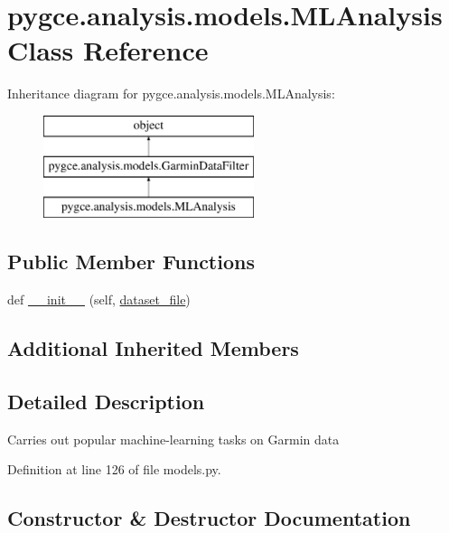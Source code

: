 \hypertarget{classpygce_1_1analysis_1_1models_1_1_m_l_analysis}{}\section{pygce.\+analysis.\+models.\+M\+L\+Analysis Class Reference}
\label{classpygce_1_1analysis_1_1models_1_1_m_l_analysis}
Inheritance diagram for pygce.\+analysis.\+models.\+M\+L\+Analysis\+:\begin{figure}[H]
\begin{center}
\leavevmode
\includegraphics[height=3.000000cm]{classpygce_1_1analysis_1_1models_1_1_m_l_analysis}
\end{center}
\end{figure}
\subsection*{Public Member Functions}
\begin{DoxyCompactItemize}
\item 
def \hyperlink{classpygce_1_1analysis_1_1models_1_1_m_l_analysis_a87a6dea18d5aa1163763e66f0142dca8}{\+\_\+\+\_\+init\+\_\+\+\_\+} (self, \hyperlink{classpygce_1_1analysis_1_1models_1_1_garmin_data_filter_a7bb7be05577c2d31546e27823a5d11c5}{dataset\+\_\+file})
\end{DoxyCompactItemize}
\subsection*{Additional Inherited Members}


\subsection{Detailed Description}
\begin{DoxyVerb}Carries out popular machine-learning tasks on Garmin data \end{DoxyVerb}
 

Definition at line 126 of file models.\+py.



\subsection{Constructor \& Destructor Documentation}

